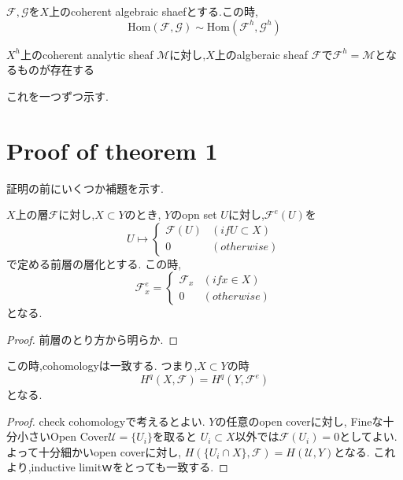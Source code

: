 \begin{thm}
$\mathcal{F}, \mathcal{G}$を$X$上のcoherent algebraic shaefとする.この時,
\begin{equation*}
 \mathrm{Hom}(\mathcal{F}, \mathcal{G}) \sim \mathrm{Hom}(\mathcal{F}^h, \mathcal{G}^h)
\end{equation*}
\end{thm}

\begin{thm}
$X^h$上のcoherent analytic sheaf $\mathcal{M}$に対し,$X$上のalgberaic sheaf $\mathcal{F}$で$\mathcal{F}^h = \mathcal{M}$となるものが存在する
\end{thm}

これを一つずつ示す.
\section{Proof of theorem 1}
証明の前にいくつか補題を示す.

\begin{lem}
$X$上の層$\mathcal{F}$に対し,$X \subset Y$のとき,
$Y$のopn set $U$に対し,$\mathcal{F}^e(U)$を
\begin{equation*}
  U \mapsto \begin{cases}
    \mathcal{F}(U) & (if U \subset X) \\
    0 & (otherwise)
\end{cases}
\end{equation*}
で定める前層の層化とする.
この時,
\begin{equation*}
\mathcal{F}^e_x =
\begin{cases}
    \mathcal{F}_x & (if x \in X) \\
    0 & (otherwise)
\end{cases}
\end{equation*}
となる.
\end{lem}
\begin{proof}
前層のとり方から明らか.
\end{proof}

\begin{lem}
この時,cohomologyは一致する.
つまり,$X \subset Y$の時
\begin{equation*}
 H^q(X, \mathcal{F}) = H^q(Y, \mathcal{F}^e)
\end{equation*}
となる.
\end{lem}
\begin{proof}
check cohomologyで考えるとよい.
$Y$の任意のopen coverに対し,
Fineな十分小さいOpen Cover$\mathcal{U} = \{U_i\}$を取ると
$U_i \subset X$以外では$\mathcal{F}(U_i) = 0$としてよい.
よって十分細かいopen coverに対し,
$H(\{U_i \cap X\}, \mathcal{F}) = H(\mathcal{U}, Y)$となる.
これより,inductive limitｗをとっても一致する.
\end{proof}

